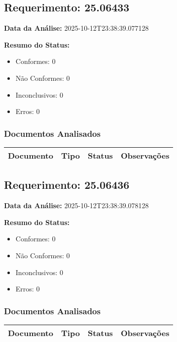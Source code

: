 \documentclass[12pt,a4paper]{article}
\begin{document}
\subsection{Requerimento: 25.06433}

\textbf{Data da Análise:} 2025-10-12T23:38:39.077128

\textbf{Resumo do Status:}
\begin{itemize}
    \item Conformes: 0
    \item Não Conformes: 0
    \item Inconclusivos: 0
    \item Erros: 0
\end{itemize}

\subsubsection{Documentos Analisados}

\begin{longtable}{|p{4cm}|p{2cm}|p{2cm}|p{6cm}|}
\hline
\textbf{Documento} & \textbf{Tipo} & \textbf{Status} & \textbf{Observações} \\
\hline
\endhead
\end{longtable}


\subsection{Requerimento: 25.06436}

\textbf{Data da Análise:} 2025-10-12T23:38:39.078128

\textbf{Resumo do Status:}
\begin{itemize}
    \item Conformes: 0
    \item Não Conformes: 0
    \item Inconclusivos: 0
    \item Erros: 0
\end{itemize}

\subsubsection{Documentos Analisados}

\begin{longtable}{|p{4cm}|p{2cm}|p{2cm}|p{6cm}|}
\hline
\textbf{Documento} & \textbf{Tipo} & \textbf{Status} & \textbf{Observações} \\
\hline
\endhead
\end{longtable}
\end{document}
